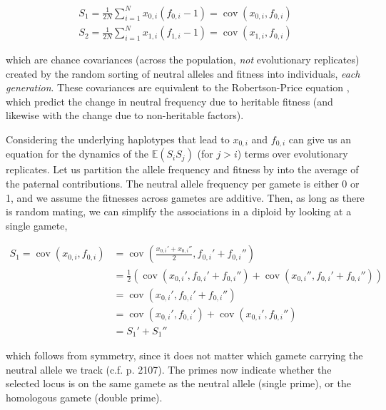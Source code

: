 \documentclass[11pt]{article}
\newcommand{\E}{\mathbb{E}}
\DeclareMathOperator{\cov}{cov}
\begin{document}
\begin{align}
  S_1 = \frac{1}{2N} \sum_{i=1}^N x_{0,i}(f_{0,i} - 1) = \cov(x_{0,i}, f_{0,i}) \\
  S_2 = \frac{1}{2N} \sum_{i=1}^N x_{1,i}(f_{1,i} - 1) = \cov(x_{1,i}, f_{0,i})
\end{align}

which are chance covariances (across the population, \emph{not} evolutionary
replicates) created by the random sorting of neutral alleles and fitness into
individuals, \emph{each generation}. These covariances are equivalent to the
Robertson-Price equation \parencite{Robertson1966-fs,Price1970-si}, which
predict the change in neutral frequency due to heritable fitness (and likewise
with the change due to non-heritable factors).

Considering the underlying haplotypes that lead to $x_{0,i}$ and $f_{0,i}$ can
give us an equation for the dynamics of the $\E(S_i S_j)$ (for $j > i$) terms
over evolutionary replicates. Let us partition the allele frequency and fitness
by into the average of the paternal contributions. The neutral allele frequency
per gamete is either 0 or 1, and we assume the fitnesses across gametes are
additive. Then, as long as there is random mating, we can simplify the
associations in a diploid by looking at a single gamete,

\begin{align}
  S_1 = \cov(x_{0,i}, f_{0,i}) &= \cov\left(\frac{x_{0,i}' + x_{0,i}''}{2}, f_{0,i}' + f_{0,i}''\right)  \\
                               &= \frac{1}{2}\left(\cov(x_{0,i}', f_{0,i}' + f_{0,i}'') + \cov(x_{0,i}'', f_{0,i}' + f_{0,i}'')\right)  \\
                               &= \cov(x_{0,i}', f_{0,i}' + f_{0,i}'')  \\
                               &= \cov(x_{0,i}', f_{0,i}') + \cov(x_{0,i}', f_{0,i}'')  \\
                               &= S_1' + S_1''
\end{align}

which follows from symmetry, since it does not matter which gamete carrying the
neutral allele we track (c.f. \cite{Santiago1998-bs} p. 2107). The primes now
indicate whether the selected locus is on the same gamete as the neutral
allele (single prime), or the homologous gamete (double prime).
\end{document}
